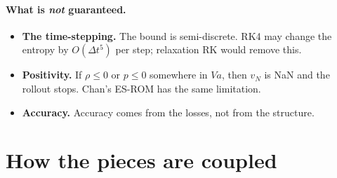 \documentclass[11pt,a4paper]{article}
\begin{document}
\paragraph{What is \emph{not} guaranteed.}
\begin{itemize}
\item \textbf{The time-stepping.} The bound is semi-discrete. RK4 may change the entropy by $O(\Delta t^5)$ per step; relaxation RK would remove this.
\item \textbf{Positivity.} If $\rho\le0$ or $p\le0$ somewhere in $Va$, then $v_N$ is NaN and the rollout stops. Chan's ES-ROM has the same limitation.
\item \textbf{Accuracy.} Accuracy comes from the losses, not from the structure.
\end{itemize}

\section{How the pieces are coupled}\label{sec:coupling}
\end{document}
